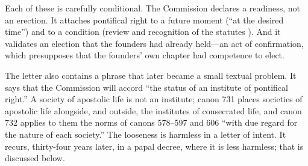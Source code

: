 Each of these is carefully conditional. The Commission declares a
readiness, not an erection. It attaches pontifical right to a future
moment (``at the desired time'') and to a condition (review and
recognition of the statutes ). And it validates an
election that the founders had already held---an act of confirmation,
which presupposes that the founders' own chapter had competence to elect.

The letter also contains a phrase that later became a small textual
problem. It says that the Commission will accord ``the status of an
institute of pontifical right.'' A society of apostolic life is not an
institute; canon 731 places societies of apostolic life alongside, and
outside, the institutes of consecrated life, and canon 732 applies to
them the norms of canons 578--597 and 606 ``with due regard for the
nature of each society.'' The looseness is harmless in a letter of
intent. It recurs, thirty-four years later, in a papal decree, where it
is less harmless; that is discussed below.


